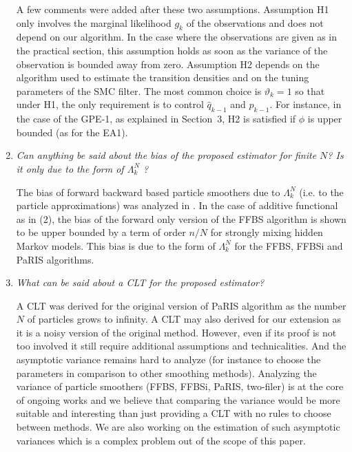 \documentclass[12pt]{article}
\newcommand{\1}{\mathrm{1}}
\begin{document}
\begin{enumerate}
A few comments were added after these two assumptions.
Assumption H1 only involves the marginal likelihood $g_k$ of the observations and does not depend on our algorithm. In the case where the observations are given as in the practical section, this assumption holds as soon as the variance of the observation is bounded away from zero. Assumption H2 depends on the algorithm used to estimate the transition densities and on the tuning parameters of the  SMC filter. The most common choice is $\vartheta_k = 1$ so that under H1, the only requirement is to control $\widehat{q}_{k-1}$ and $p_{k-1}$. For instance, in the case of the GPE-1, as explained in Section~3, H2 is satisfied if $\phi$ is upper bounded (as for the EA1). 


\item {\em Can anything be said about the bias of the proposed estimator for finite $N$? Is it
only due to the form of  $\Lambda_k^N$ ?}

\vspace{.3cm}

The bias of forward backward based particle smoothers due to $\Lambda_k^N$ (i.e. to the particle approximations) was analyzed in \cite{delmoral:doucet:singh:2010}. In the case of additive functional as in (2), the bias of the forward only version of the FFBS algorithm is shown to be upper bounded by a term of order $n/N$ for strongly mixing hidden Markov models.  This bias is due to the form of  $\Lambda_k^N$ for the FFBS, FFBSi and PaRIS algorithms.


\item {\em What can be said about a CLT for the proposed estimator?}

\vspace{.3cm}

A CLT was derived for the original version of PaRIS algorithm as the number $N$ of particles grows to infinity. A CLT may also derived for our extension as it is a noisy version of the original method. However, even if its proof is not too involved it still require additional assumptions and technicalities. And the asymptotic variance remains hard to analyze (for instance to choose the parameters in comparison to other smoothing methods). Analyzing the variance of particle smoothers (FFBS, FFBSi, PaRIS, two-filer) is at the core of ongoing works and we believe that comparing the variance would be more suitable and interesting than just providing a CLT with no rules to choose between methods. We are also working on the estimation of such asymptotic variances which is a complex problem out of the scope of this paper.


\end{enumerate}
\end{document}

